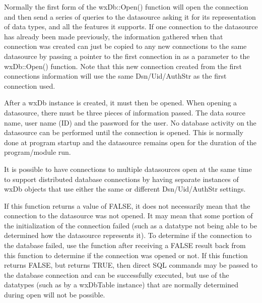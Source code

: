 Normally the first form of the wxDb::Open() function will open the connection
and then send a series of queries to the datasource asking it for its
representation of data types, and all the features it supports.  If one
connection to the datasource has already been made previously, the information
gathered when that connection was created can just be copied to any new
connections to the same datasource by passing a pointer to the first
connection in as a parameter to the wxDb::Open() function.  Note that this
new connection created from the first connections information will use the
same Dsn/Uid/AuthStr as the first connection used.




After a wxDb instance is created, it must then be opened.  When opening a
datasource, there must be three pieces of information passed.  The data
source name, user name (ID) and the password for the user.  No database
activity on the datasource can be performed until the connection is opened.
This is normally done at program startup and the datasource remains
open for the duration of the program/module run.

It is possible to have connections to multiple datasources open at the same
time to support distributed database connections by having separate instances
of wxDb objects that use either the same or different Dsn/Uid/AuthStr settings.

If this function returns a value of FALSE, it does not necessarily mean that
the connection to the datasource was not opened.  It may mean that some
portion of the initialization of the connection failed (such as a datatype not
being able to be determined how the datasource represents it).  To determine
if the connection to the database failed, use the 
function after receiving a FALSE result back from this function to determine if
the connection was opened or not.  If this function returns FALSE, but 
returns TRUE, then direct SQL commands may be passed to the database
connection and can be successfully executed, but use of the datatypes (such as
by a wxDbTable instance) that are normally determined during open will not be
possible.

